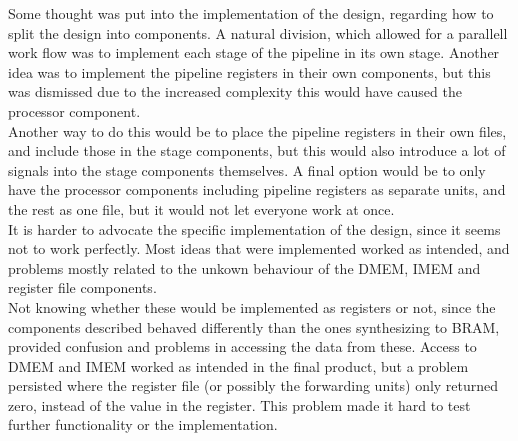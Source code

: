 Some thought was put into the implementation of the design, regarding how to split the design into components. A natural division, which allowed for a parallell work flow was to implement each stage of the pipeline in its own stage. Another idea was to implement the pipeline registers in their own components, but this was dismissed due to the increased complexity this would have caused the processor component.\\
Another way to do this would be to place the pipeline registers in their own files, and include those in the stage components, but this would also introduce a lot of signals into the stage components themselves. A final option would be to only have the processor components including pipeline registers as separate units, and the rest as one file, but it would not let everyone work at once.\\
It is harder to advocate the specific implementation of the design, since it seems not to work perfectly. Most ideas that were implemented worked as intended, and problems mostly related to the unkown behaviour of the DMEM, IMEM and register file components.\\
Not knowing whether these would be implemented as registers or not, since the components described behaved differently than the ones synthesizing to BRAM, provided confusion and problems in accessing the data from these. Access to DMEM and IMEM worked as intended in the final product, but a problem persisted where the register file (or possibly the forwarding units) only returned zero, instead of the value in the register. This problem made it hard to test further functionality or the implementation.